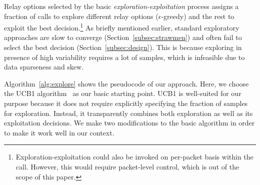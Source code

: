 Relay options selected by the basic {\em exploration-exploitation} process assigns a fraction of calls  to explore different relay options ($\epsilon$-greedy) and the rest to exploit the best decision.\footnote{Exploration-exploitation could also be invoked on per-packet basis within the call. However, this would require packet-level control, which is out of the scope of this paper.}
As briefly mentioned earlier, standard exploratory approaches  are slow to converge (Section~\ref{subsec:strawmen}) and often fail to select the best decision (Section~\ref{subsec:design}). This is because exploring in presence of high variability requires a lot of samples, which is infeasible due to data sparseness and skew. %

Algorithm~\ref{alg:explore} shows the pseudocode of our approach.
 Here, we choose  the UCB1 algorithm~\cite{UCB1} as our 
 basic starting point. UCB1 is well-suited for our purpose because  
 it does not require explicitly specifying the fraction of samples for exploration. Instead, it transparently combines both exploration as well as its exploitation decisions. %
 We make two modifications to the basic algorithm
 in order to make it work well in our context.


